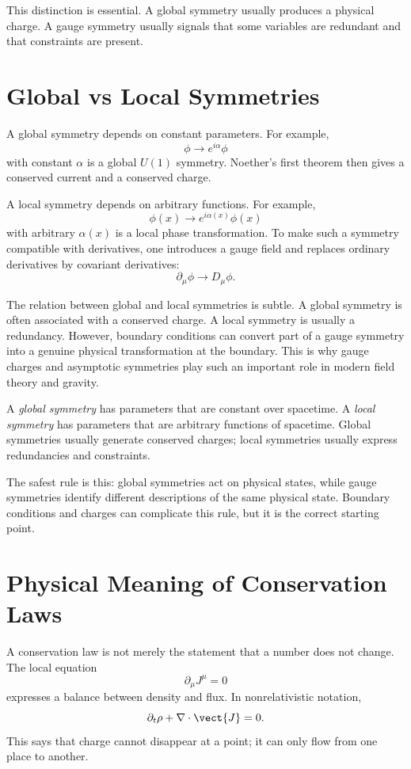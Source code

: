This distinction is essential. A global symmetry usually produces a physical
charge. A gauge symmetry usually signals that some variables are redundant and
that constraints are present.

\section{Global vs Local Symmetries}

A global symmetry depends on constant parameters. For example,
\[
    \phi\longrightarrow e^{i\alpha}\phi
\]
with constant \(\alpha\) is a global \(U(1)\) symmetry. Noether's first theorem
then gives a conserved current and a conserved charge.

A local symmetry depends on arbitrary functions. For example,
\[
    \phi(x)\longrightarrow e^{i\alpha(x)}\phi(x)
\]
with arbitrary \(\alpha(x)\) is a local phase transformation. To make such a
symmetry compatible with derivatives, one introduces a gauge field and replaces
ordinary derivatives by covariant derivatives:
\[
    \partial_\mu\phi\longrightarrow D_\mu\phi.
\]

The relation between global and local symmetries is subtle. A global symmetry is
often associated with a conserved charge. A local symmetry is usually a
redundancy. However, boundary conditions can convert part of a gauge symmetry
into a genuine physical transformation at the boundary. This is why gauge
charges and asymptotic symmetries play such an important role in modern field
theory and gravity.

\begin{definitionbox}
A \emph{global symmetry} has parameters that are constant over spacetime. A
\emph{local symmetry} has parameters that are arbitrary functions of spacetime.
Global symmetries usually generate conserved charges; local symmetries usually
express redundancies and constraints.
\end{definitionbox}

The safest rule is this: global symmetries act on physical states, while gauge
symmetries identify different descriptions of the same physical state. Boundary
conditions and charges can complicate this rule, but it is the correct starting
point.

\section{Physical Meaning of Conservation Laws}

A conservation law is not merely the statement that a number does not change.
The local equation
\[
    \partial_\mu J^\mu=0
\]
expresses a balance between density and flux. In nonrelativistic notation,
\[
    \partial_t\rho+\nabla\cdot\vect{J}=0.
\]
This says that charge cannot disappear at a point; it can only flow from one
place to another.

